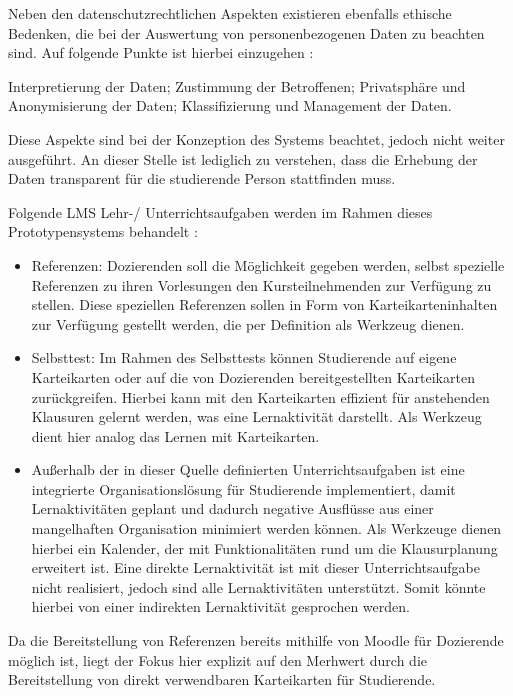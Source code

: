 Neben den datenschutzrechtlichen Aspekten existieren ebenfalls ethische Bedenken, die bei der Auswertung von personenbezogenen Daten zu beachten sind. Auf folgende Punkte ist hierbei einzugehen \autocite[S.1510]{learningAnalyticsEthicalUssuesAndDilemmas}:

	Interpretierung der Daten; Zustimmung der Betroffenen; Privatsphäre und Anonymisierung der Daten; Klassifizierung und Management der Daten.
	
Diese Aspekte sind bei der Konzeption des Systems beachtet, jedoch nicht weiter ausgeführt. An dieser Stelle ist lediglich zu verstehen, dass die Erhebung der Daten transparent für die studierende Person stattfinden muss. 
	

Folgende \ac{LMS} Lehr-/ Unterrichtsaufgaben werden im Rahmen dieses Prototypensystems behandelt \autocite[S.248]{SCHOONENBOOM2014247}:
\begin{itemize}
	\item Referenzen: Dozierenden soll die Möglichkeit gegeben werden, selbst spezielle Referenzen zu ihren Vorlesungen den Kursteilnehmenden zur Verfügung zu stellen. Diese speziellen Referenzen sollen in Form von Karteikarteninhalten zur Verfügung gestellt werden, die per Definition als Werkzeug dienen.
	\item Selbsttest: Im Rahmen des Selbsttests können Studierende auf eigene Karteikarten oder auf die von Dozierenden bereitgestellten Karteikarten zurückgreifen. Hierbei kann mit den Karteikarten effizient für anstehenden Klausuren gelernt werden, was eine Lernaktivität darstellt. Als Werkzeug dient hier analog das Lernen mit Karteikarten.
	\item Außerhalb der in dieser Quelle definierten Unterrichtsaufgaben ist eine integrierte Organisationslösung für Studierende implementiert, damit Lernaktivitäten geplant und dadurch negative Ausflüsse aus einer mangelhaften Organisation minimiert werden können.	Als Werkzeuge dienen hierbei ein Kalender, der mit Funktionalitäten rund um die Klausurplanung erweitert ist. Eine direkte Lernaktivität ist mit dieser Unterrichtsaufgabe nicht realisiert, jedoch sind alle Lernaktivitäten unterstützt. Somit könnte hierbei von einer indirekten Lernaktivität gesprochen werden.
\end{itemize}

Da die Bereitstellung von Referenzen bereits mithilfe von Moodle für Dozierende möglich ist, liegt der Fokus hier explizit auf den Merhwert durch die Bereitstellung von direkt verwendbaren Karteikarten für Studierende.

